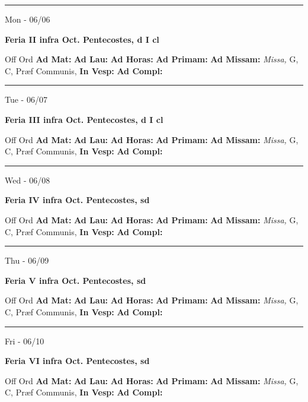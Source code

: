 \documentclass[letterpaper, 10pt]{article}
\begin{document}
\hrule
\begin{center}
Mon - 06/06
\end{center}\textbf{ \large Feria II infra Oct. Pentecostes, \textnormal{\normalsize d I cl}}
\begin{justify}
Off Ord
\textbf{Ad Mat: }
\textbf{Ad Lau: }
\textbf{Ad Horas: }
\textbf{Ad Primam: }
\textbf{Ad Missam:} \textit{Missa, } G, C, Præf Communis, 
\textbf{In Vesp: }
\textbf{Ad Compl: }\end{justify}



\hrule
\begin{center}
Tue - 06/07
\end{center}\textbf{ \large Feria III infra Oct. Pentecostes, \textnormal{\normalsize d I cl}}
\begin{justify}
Off Ord
\textbf{Ad Mat: }
\textbf{Ad Lau: }
\textbf{Ad Horas: }
\textbf{Ad Primam: }
\textbf{Ad Missam:} \textit{Missa, } G, C, Præf Communis, 
\textbf{In Vesp: }
\textbf{Ad Compl: }\end{justify}



\hrule
\begin{center}
Wed - 06/08
\end{center}\textbf{ \large Feria IV infra Oct. Pentecostes, \textnormal{\normalsize sd}}
\begin{justify}
Off Ord
\textbf{Ad Mat: }
\textbf{Ad Lau: }
\textbf{Ad Horas: }
\textbf{Ad Primam: }
\textbf{Ad Missam:} \textit{Missa, } G, C, Præf Communis, 
\textbf{In Vesp: }
\textbf{Ad Compl: }\end{justify}



\hrule
\begin{center}
Thu - 06/09
\end{center}\textbf{ \large Feria V infra Oct. Pentecostes, \textnormal{\normalsize sd}}
\begin{justify}
Off Ord
\textbf{Ad Mat: }
\textbf{Ad Lau: }
\textbf{Ad Horas: }
\textbf{Ad Primam: }
\textbf{Ad Missam:} \textit{Missa, } G, C, Præf Communis, 
\textbf{In Vesp: }
\textbf{Ad Compl: }\end{justify}



\hrule
\begin{center}
Fri - 06/10
\end{center}\textbf{ \large Feria VI infra Oct. Pentecostes, \textnormal{\normalsize sd}}
\begin{justify}
Off Ord
\textbf{Ad Mat: }
\textbf{Ad Lau: }
\textbf{Ad Horas: }
\textbf{Ad Primam: }
\textbf{Ad Missam:} \textit{Missa, } G, C, Præf Communis, 
\textbf{In Vesp: }
\textbf{Ad Compl: }\end{justify}
\end{document}
